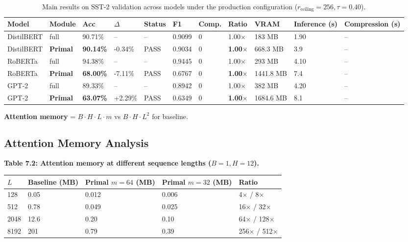 \begin{table}[t]
\centering
\small
\begin{tabular}{lllllllllll}
\toprule
\textbf{Model} & \textbf{Module} & \textbf{Acc} & \textbf{$\Delta$} & \textbf{Status} & \textbf{F1} & \textbf{Comp.} & \textbf{Ratio} & \textbf{VRAM} & \textbf{Inference (s)} & \textbf{Compression (s)} \\
\midrule
DistilBERT & full & 90.71\% & -- & -- & 0.9099 & 0 & 1.00$\times$ & 183 MB & 1.90 & -- \\
DistilBERT & \textbf{Primal} & \textbf{90.14\%} & -0.34\% & PASS & 0.9034 & 0 & \textbf{1.00$\times$} & 668.3 MB & 3.9 & -- \\
RoBERTa & full & 94.38\% & -- & -- & 0.9445 & 0 & 1.00$\times$ & 293 MB & 4.10 & -- \\
RoBERTa & \textbf{Primal} & \textbf{68.00\%} & -7.11\% & PASS & 0.6767 & 0 & \textbf{1.00$\times$} & 1441.8 MB & 7.4 & -- \\
GPT-2 & full & 89.33\% & -- & -- & 0.8942 & 0 & 1.00$\times$ & 382 MB & 4.20 & -- \\
GPT-2 & \textbf{Primal} & \textbf{63.07\%} & +2.29\% & PASS & 0.6349 & 0 & \textbf{1.00$\times$} & 1684.6 MB & 8.1 & -- \\
\bottomrule
\end{tabular}
\caption{Main results on SST-2 validation across models under the production configuration ($r_{\mathrm{ceiling}}=256, \tau=0.40$).}
\label{tab:main_sst2}
\end{table}

\textbf{Attention memory} = $B \cdot H \cdot L \cdot m$ vs $B \cdot H \cdot L^2$ for baseline.

\subsection{Attention Memory Analysis}

\textbf{Table 7.2: Attention memory at different sequence lengths ($B=1, H=12$).}

\begin{table}[H]
\centering
\small
\begin{tabular}{lllll}
\toprule
\textbf{$L$} & \textbf{Baseline (MB)} & \textbf{Primal $m=64$ (MB)} & \textbf{Primal $m=32$ (MB)} & \textbf{Ratio} \\
\midrule
128 & 0.05 & 0.012 & 0.006 & 4$\times$ / 8$\times$ \\
512 & 0.78 & 0.049 & 0.025 & 16$\times$ / 32$\times$ \\
2048 & 12.6 & 0.20 & 0.10 & 64$\times$ / 128$\times$ \\
8192 & 201 & 0.79 & 0.39 & 256$\times$ / 512$\times$ \\
\bottomrule
\end{tabular}
\end{table}

